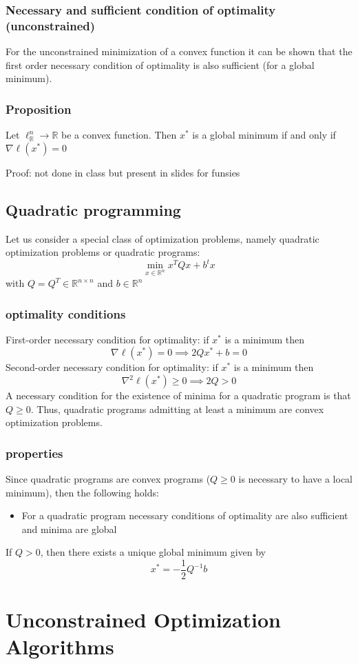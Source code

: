 \documentclass{book}
\newcommand{\R}{\mathbb{R}}
\theoremstyle{definition}
\theoremstyle{remark}
\theoremstyle{remark}
\begin{document}
\subsubsection{Necessary and sufficient condition of optimality (unconstrained)}
For the unconstrained minimization of a convex function it can be shown that the first order necessary condition of optimality is also sufficient (for a global minimum).
\subsubsection{Proposition}
Let $\ell_\R^n \to \R$ be a convex function. Then $x^*$ is a global minimum if and only if $\nabla\ell(x^*)=0$

Proof: not done in class but present in slides for funsies

\subsection{Quadratic programming}
Let us consider a special class of optimization problems, namely quadratic optimization problems or quadratic programs: 
\[
    \min_{x\in\R^n}x^TQx+b^tx
\]
with $Q=Q^T\in\R^{n\times n}$ and $b\in\R^n$
\subsubsection{optimality conditions}
First-order necessary condition for optimality: if $x^*$ is a minimum then 
\[
    \nabla \ell(x^*)=0 \implies 2Qx^*+b=0
\]
Second-order necessary condition for optimality: if $x^*$ is a minimum then 
\[
    \nabla^2\ell(x^*)\geq 0 \implies 2Q>0
\]
A necessary condition for the existence of minima for a quadratic program is that $Q\geq 0$. Thus, quadratic programs admitting at least a minimum are convex optimization problems.
\subsubsection{properties}
Since quadratic programs are convex programs ($Q\geq 0$ is necessary to have a local minimum), then the following holds: 
\begin{itemize}
    \item For a quadratic program necessary conditions of optimality are also sufficient and minima are global
\end{itemize}
If $Q>0$, then there exists a unique global minimum given by 
\[
    x^* = -\displaystyle\frac{1}{2}Q^{-1}b
\]

\section{Unconstrained Optimization Algorithms}
\end{document}
